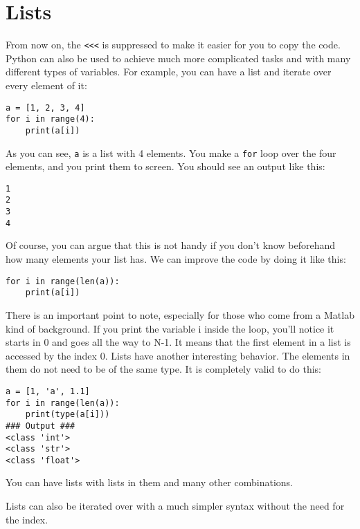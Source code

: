 \section{Lists}\label{sec:lists}
From now on, the \texttt{<<<} is suppressed to make it easier for you to copy the code. Python can also be used to achieve much more complicated tasks and with many different types of variables. For example, you can have a list and iterate over every element of it:

\begin{verbatim}
a = [1, 2, 3, 4]
for i in range(4):
    print(a[i])
\end{verbatim}

As you can see, \texttt{a} is a list with 4 elements. You make a
\texttt{for} loop over the four elements, and you print them to screen.
You should see an output like this:

\begin{verbatim}
1
2
3
4
\end{verbatim}

Of course, you can argue that this is not handy if you don't know beforehand how many elements your list has. We can improve the code by doing it like this:

\begin{verbatim}
for i in range(len(a)):
    print(a[i])
\end{verbatim}

There is an important point to note, especially for those who come from a Matlab kind of background. If you print the variable i inside the loop, you'll notice it starts in 0 and goes all the way to N-1. It means that the first element in a list is accessed by the index 0. Lists have another interesting behavior. The elements in them do not need to be of the same type. It is completely valid to do this:

\begin{verbatim}
a = [1, 'a', 1.1]
for i in range(len(a)):
    print(type(a[i]))
### Output ###
<class 'int'>
<class 'str'>
<class 'float'>
\end{verbatim}

You can have lists with lists in them and many other combinations.


Lists can also be iterated over with a much simpler syntax without the need for the index.

